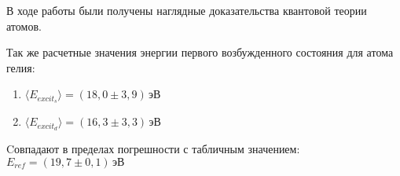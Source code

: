 В ходе работы были получены наглядные доказательства квантовой теории атомов.

Так же расчетные значения энергии первого возбужденного состояния для атома гелия: \\
\begin{enumerate}
    \item $ \langle E_{excit_s} \rangle = \left( 18,0 \pm 3,9 \right) \, \texttt{эВ} $
    \item $ \langle E_{excit_d} \rangle = \left( 16,3 \pm 3,3 \right) \, \texttt{эВ} $
\end{enumerate}

Cовпадают в пределах погрешности с табличным значением: \\

$ E_{ref} = \left( 19,7 \pm 0,1 \right) \, \texttt{эВ} $
